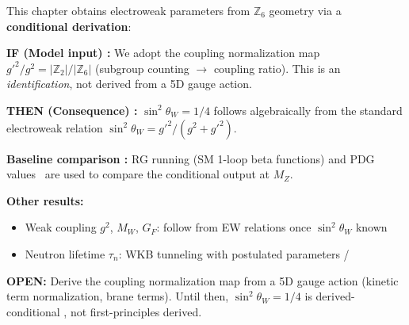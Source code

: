 

\begin{tcolorbox}[edcGuardrail, title=\textbf{Epistemic Status}]
This chapter obtains electroweak parameters from $\mathbb{Z}_6$ geometry via a
\textbf{conditional derivation}:

\textbf{IF (Model input) \tagP{}:} We adopt the coupling normalization map
$g'^2/g^2 = |\mathbb{Z}_2|/|\mathbb{Z}_6|$ (subgroup counting $\to$ coupling ratio).
This is an \emph{identification}, not derived from a 5D gauge action.

\textbf{THEN (Consequence) \tagDc{}:} $\sin^2\theta_W = 1/4$ follows algebraically
from the standard electroweak relation $\sin^2\theta_W = g'^2/(g^2+g'^2)$.

\textbf{Baseline comparison \tagBL{}:} RG running (SM 1-loop beta functions) and
PDG values~\cite{PDG2024} are used to compare the conditional output at $M_Z$.

\textbf{Other results:}
\begin{itemize}[nosep]
    \item Weak coupling $g^2$, $M_W$, $G_F$: follow from EW relations once $\sin^2\theta_W$ known \tagDc{}
    \item Neutron lifetime $\tau_n$: WKB tunneling with postulated parameters \tagDc{}/\tagP{}
\end{itemize}

\textbf{OPEN:} Derive the coupling normalization map from a 5D gauge action
(kinetic term normalization, brane terms). Until then, $\sin^2\theta_W = 1/4$
is derived-conditional \tagDc{}, not first-principles derived.
\end{tcolorbox}


